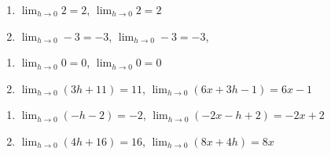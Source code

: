\documentclass{ximera}
\begin{document}
	\author{Stitz-Zeager}


\begin{enumerate}

\item $\lim_{h \rightarrow 0} 2 = 2$, $\lim_{h \rightarrow 0} 2 = 2$
\item $\lim_{h \rightarrow 0} -3 = -3$, $\lim_{h \rightarrow 0} -3 = -3$,

\setcounter{HW}{\value{enumi}}
\end{enumerate}

\begin{enumerate}
\setcounter{enumi}{\value{HW}}

\item $\lim_{h \rightarrow 0} 0 = 0$,  $\lim_{h \rightarrow 0} 0 = 0$
\item  $\lim_{h \rightarrow 0} (3h+11)= 11$,   $\lim_{h \rightarrow 0} (6x+3h-1)= 6x-1$

\setcounter{HW}{\value{enumi}}
\end{enumerate}

\begin{enumerate}
\setcounter{enumi}{\value{HW}}

\item    $\lim_{h \rightarrow 0} (-h-2) = -2$,   $\lim_{h \rightarrow 0} (-2x-h+2) = -2x+2$   
\item   $\lim_{h \rightarrow 0} (4h+16) = 16$,   $\lim_{h \rightarrow 0} (8x+4h) = 8x$ 

\setcounter{HW}{\value{enumi}}
\end{enumerate}
\end{document}
